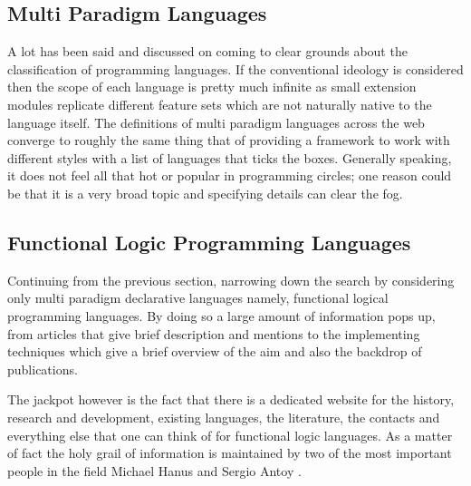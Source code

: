 \documentclass[thesis-solanki.tex]{subfiles}
\begin{document}
\subsection{Multi Paradigm Languages}

  A lot has been said and discussed on
  coming to clear grounds about the classification of programming languages.
  If the conventional ideology
  is considered then the scope of each language is pretty much infinite as small
  extension modules replicate different feature sets which are not naturally native to the language itself.
  The definitions of multi paradigm languages across the web
  \cite{website:wikimultiparadigm,website:mdn,website:blogc2} converge to roughly the same thing that of providing
  a framework to work with different styles with a list of languages \cite{website:wikimpllist,website:dmoz} that
  ticks the boxes.
  Generally speaking, it
  does not feel all that hot or popular in programming circles; one reason could be that it
  is a very broad topic and specifying details can clear the fog.

\subsection{Functional Logic Programming Languages}

  Continuing from the previous section, narrowing down the search by considering only multi paradigm declarative
  languages namely, functional logical programming languages.
  By doing so a large amount of information pops up, from articles that give brief description and mentions
  \cite{website:wikiflpl, website:wikiflpllist} to the implementing techniques \cite{website:imlpementingflpl}
  which give a brief overview of the aim and also the backdrop of publications.

  The jackpot however is the fact that there is a dedicated website \cite{website:funclogprog} for the history,
  research and development, existing languages, the literature, the contacts and everything else that one can think
  of for functional logic languages.
  As a matter of fact the holy grail of information is maintained by two of the most important people in the field
  Michael Hanus \cite{website:mhanus} and Sergio Antoy \cite{website:santoy}.
\end{document}
